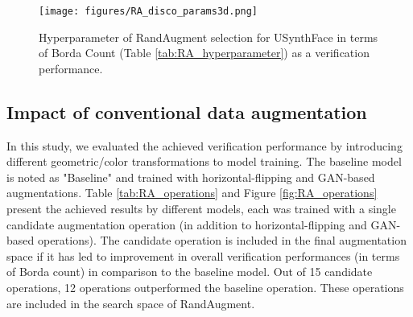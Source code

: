 \documentclass[10pt,twocolumn,letterpaper]{ieeeconf}
\begin{document}
\begin{figure}[h!]
	\centering
	\texttt{[image: figures/RA\_disco\_params3d.png]}
    \caption{Hyperparameter of RandAugment selection for USynthFace in terms of Borda Count (Table \ref{tab:RA_hyperparameter}) as a verification performance. }
	\label{fig:RA_hyperparameters}
	\vspace{-5mm}
\end{figure}


\subsection{Impact of conventional data augmentation}
\label{sec:abl_RA_operations}
In this study, we evaluated the achieved verification performance by introducing different geometric/color transformations to model training.
The baseline model is noted as "Baseline" and trained with horizontal-flipping and GAN-based augmentations.
Table \ref{tab:RA_operations} and Figure \ref{fig:RA_operations} present the achieved results by different models, each was trained with a single candidate augmentation operation (in addition to horizontal-flipping and GAN-based operations). The candidate operation is included in the final augmentation space if it has led to improvement in overall verification performances (in terms of Borda count) in comparison to the baseline model. Out of 15 candidate operations, 12 operations outperformed the baseline operation. 
These operations are included in the search space of RandAugment. 
\end{document}
